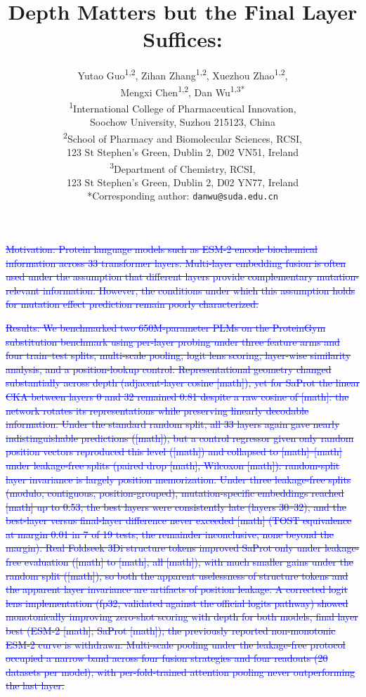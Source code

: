 \documentclass[11pt,a4paper]{article}
\title{\LARGE\bfseries Depth Matters but the Final Layer Suffices:\\\revised{Leakage-Free Evaluation of Layer Choice in Protein Language Models for Mutation Effect Prediction}}
\author{
\large
Yutao Guo\textsuperscript{1,2}, Zihan Zhang\textsuperscript{1,2}, Xuezhou Zhao\textsuperscript{1,2},\\[2pt]
Mengxi Chen\textsuperscript{1,2}, Dan Wu\textsuperscript{1,3*}\\[8pt]
\small
\textsuperscript{1}International College of Pharmaceutical Innovation,\\
\hspace*{1em}Soochow University, Suzhou 215123, China\\[4pt]
\textsuperscript{2}School of Pharmacy and Biomolecular Sciences, RCSI,\\
\hspace*{1em}123 St Stephen's Green, Dublin 2, D02 VN51, Ireland\\[4pt]
\textsuperscript{3}Department of Chemistry, RCSI,\\
\hspace*{1em}123 St Stephen's Green, Dublin 2, D02 YN77, Ireland\\[8pt]
*Corresponding author: \texttt{danwu@suda.edu.cn}}
\date{}
\begin{document}
\maketitle

\textcolor{blue}{\sout{Motivation: Protein language models such as ESM-2 encode biochemical information across
33 transformer layers. Multi-layer embedding fusion is often used under the assumption
that different layers provide complementary mutation-relevant information. However,
the conditions under which this assumption holds for mutation effect prediction remain
poorly characterized.}}

\textcolor{blue}{\sout{Results: We benchmarked two 650M-parameter PLMs on the ProteinGym substitution
benchmark using per-layer probing under three feature arms and four train--test splits,
multi-scale pooling, logit lens scoring, layer-wise similarity analysis, and a
position-lookup control. Representational geometry changed substantially across depth
(adjacent-layer cosine [math]), yet for SaProt the linear CKA between layers 0
and 32 remained 0.81 despite a raw cosine of [math]: the network rotates its
representations while preserving linearly decodable information. Under the standard
random split, all 33 layers again gave nearly indistinguishable predictions
([math]), but a control regressor given only random position vectors
reproduced this level ([math]) and collapsed to [math]--[math] under
leakage-free splits (paired drop [math], Wilcoxon [math]):
random-split layer invariance is largely position memorization. Under three
leakage-free splits (modulo, contiguous, position-grouped), mutation-specific
embeddings reached [math] up to 0.53, the best layers were consistently late (layers
30--32), and the best-layer versus final-layer difference never exceeded
[math] (TOST equivalence at margin 0.01 in 7 of 19 tests; the remainder
inconclusive, none beyond the margin). Real Foldseek 3Di structure tokens improved
SaProt only under leakage-free evaluation ([math] to [math], all [math]),
with much smaller gains under the random split ([math]), so both the apparent
uselessness of structure tokens and the apparent layer invariance are artifacts of
position leakage. A corrected logit lens implementation (fp32, validated against the
official logits pathway) showed monotonically improving zero-shot scoring with depth
for both models, final layer best (ESM-2 [math]; SaProt [math]); the
previously reported non-monotonic ESM-2 curve is withdrawn. Multi-scale pooling under
the leakage-free protocol occupied a narrow band across four fusion strategies and
four readouts (20 datasets per model), with per-fold-trained attention pooling never
outperforming the last layer.}}
\end{document}
